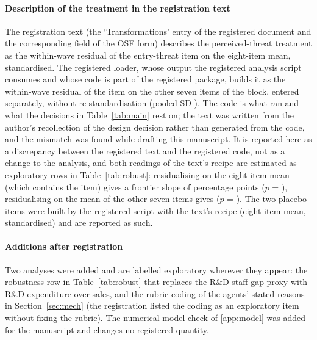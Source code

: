 \documentclass[preprint,12pt,authoryear]{elsarticle}
\begin{document}
\paragraph{Description of the treatment in the registration text} The registration text (the `Transformations' entry of the registered document and the corresponding field of the OSF form) describes the perceived-threat treatment as the within-wave residual of the entry-threat item on the eight-item mean, standardised. The registered loader, whose output the registered analysis script consumes and whose code is part of the registered package, builds it as the within-wave residual of the item on the other seven items of the block, entered separately, without re-standardisation (pooled SD \ThreatResidSDPooled). The code is what ran and what the decisions in Table~\ref{tab:main} rest on; the text was written from the author's recollection of the design decision rather than generated from the code, and the mismatch was found while drafting this manuscript. It is reported here as a discrepancy between the registered text and the registered code, not as a change to the analysis, and both readings of the text's recipe are estimated as exploratory rows in Table~\ref{tab:robust}: residualising on the eight-item mean (which contains the item) gives a frontier slope of \ResidMeanEightHOnePp{} percentage points ($p$ = \ResidMeanEightHOneP), residualising on the mean of the other seven items gives \ResidMeanSevenHOnePp{} ($p$ = \ResidMeanSevenHOneP). The two placebo items were built by the registered script with the text's recipe (eight-item mean, standardised) and are reported as such.

\paragraph{Additions after registration} Two analyses were added and are labelled exploratory wherever they appear: the robustness row in Table~\ref{tab:robust} that replaces the R\&D-staff gap proxy with R\&D expenditure over sales, and the rubric coding of the agents' stated reasons in Section~\ref{sec:mech} (the registration listed the coding as an exploratory item without fixing the rubric). The numerical model check of \ref{app:model} was added for the manuscript and changes no registered quantity.
\end{document}
